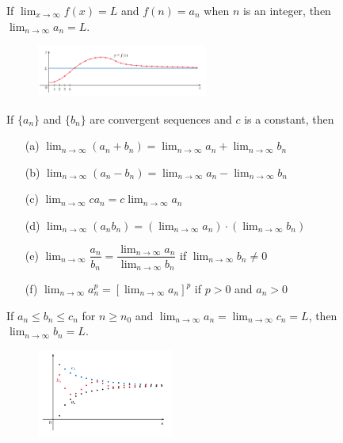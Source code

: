 \documentclass{article}
\theoremstyle{mystyle}
\begin{document}
\begin{tcolorbox}[colback=white, colframe=orange!80!white, title=Theorem 1, boxrule=0.5mm, arc=3mm]
If \( \lim_{x\to\infty} f(x) = L \) and \(f(n) = a_n\) when \(n\) is an integer, then \( \lim_{n\to\infty} a_n = L \).
\end{tcolorbox}

\begin{figure}[htbp]
  \centering
  \includegraphics[width=0.5\textwidth]{graph69.png}
\end{figure}

\begin{tcolorbox}[colback=white, colframe=orange!80!white, title=Limit Laws for Sequences (Theorem 2), boxrule=0.5mm, arc=3mm]
If \(\{a_n\}\) and \(\{b_n\}\) are convergent sequences and \(c\) is a constant, then
\begin{itemize}
    \item[(a)] \( \lim_{n\to\infty} (a_n + b_n) = \lim_{n\to\infty} a_n + \lim_{n\to\infty} b_n \)
    \item[(b)] \( \lim_{n\to\infty} (a_n - b_n) = \lim_{n\to\infty} a_n - \lim_{n\to\infty} b_n \)
    \item[(c)] \( \lim_{n\to\infty} ca_n = c \lim_{n\to\infty} a_n \)
    \item[(d)] \( \lim_{n\to\infty} (a_n b_n) = (\lim_{n\to\infty} a_n) \cdot (\lim_{n\to\infty} b_n) \)
    \item[(e)] \( \lim_{n\to\infty} \dfrac{a_n}{b_n} = \dfrac{\lim_{n\to\infty} a_n}{\lim_{n\to\infty} b_n} \) if \( \lim_{n\to\infty} b_n \neq 0 \)
    \item[(f)] \( \lim_{n\to\infty} a_n^p = \left[\lim_{n\to\infty} a_n\right]^p \) if \(p>0\) and \(a_n>0\)
\end{itemize}
\end{tcolorbox}

\begin{tcolorbox}[colback=white, colframe=orange!80!white, title=The Squeeze Theorem for Sequences (Theorem 3), boxrule=0.5mm, arc=3mm]
If \(a_n \le b_n \le c_n\) for \(n \ge n_0\) and \( \lim_{n\to\infty} a_n = \lim_{n\to\infty} c_n = L \), then \( \lim_{n\to\infty} b_n = L \).
\end{tcolorbox}

\begin{figure}[htbp]
  \centering
  \includegraphics[width=0.4\textwidth]{graph70.png}
\end{figure}
\end{document}
